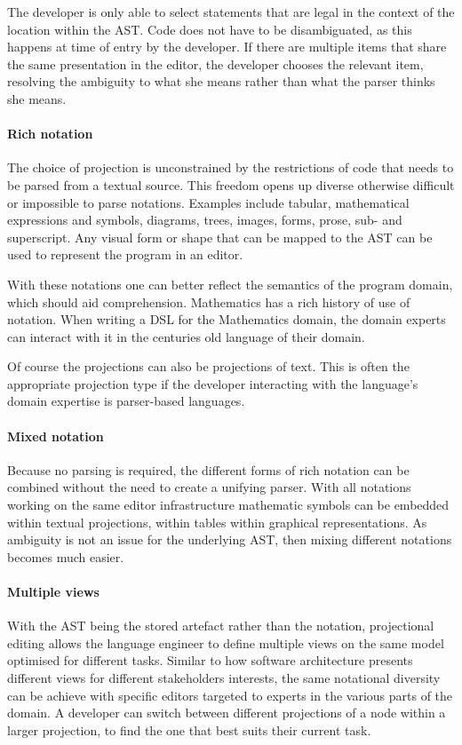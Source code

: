 The developer is only able to select statements that are legal in the context of the location within the AST.
Code does not have to be disambiguated, as this happens at time of entry by the developer.
If there are multiple items that share the same presentation in the editor, the developer chooses the relevant item, resolving the ambiguity to what she means rather than what the parser thinks she means.

\paragraph{Rich notation}
The choice of projection is unconstrained by the restrictions of code that needs to be parsed from a textual source.
This freedom opens up diverse otherwise difficult or impossible to parse notations.
Examples include tabular, mathematical expressions and symbols, diagrams, trees, images, forms, prose, sub- and superscript.
Any visual form or shape that can be mapped to the AST can be used to represent the program in an editor.

With these notations one can better reflect the semantics of the program domain, which should aid comprehension.
Mathematics has a rich history of use of notation.
When writing a DSL for the Mathematics domain, the domain experts can interact with it in the centuries old language of their domain. 

Of course the projections can also be projections of text.  
This is often the appropriate projection type if the developer interacting with the language's domain expertise is parser-based languages.

\paragraph{Mixed notation}
Because no parsing is required, the different forms of rich notation can be combined without the need to create a unifying parser.
With all notations working on the same editor infrastructure mathematic symbols can be embedded within textual projections, within tables within graphical representations.
As ambiguity is not an issue for the underlying AST, then mixing different notations becomes much easier.

\paragraph{Multiple views}
With the AST being the stored artefact rather than the notation, projectional editing allows the language engineer to define multiple views on the same model optimised for different tasks.
Similar to how software architecture presents different views for different stakeholders interests, the same notational diversity can be achieve with specific editors targeted to experts in the various parts of the domain.
A developer can switch between different projections of a node within a larger projection, to find the one that best suits their current task.

